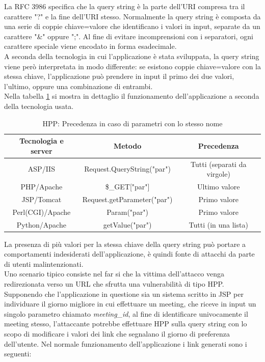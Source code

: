 La RFC 3986\cite{rfc3986} specifica che la query string è la parte dell'URI compresa tra il carattere "?" e la fine dell'URI stesso. Normalmente la query string è composta da una serie di coppie chiave=valore che identificano i valori in input, separate da un carattere "\&" oppure ";". Al fine di evitare incomprensioni con i separatori, ogni carattere speciale viene encodato in forma esadecimale.	\\
A seconda della tecnologia in cui l'applicazione è stata sviluppata, la query string viene però interpretata in modo differente: se esistono coppie chiave=valore con la stessa chiave, l'applicazione può prendere in input il primo dei due valori, l'ultimo, oppure una combinazione di entrambi.\\
Nella tabella \ref{hpp} si mostra in dettaglio il funzionamento dell'applicazione a seconda della tecnologia usata.

\begin{table}[!h]
\center
\begin{tabular}{|c|c|c|}
\hline
Tecnologia e server & Metodo & Precedenza \\
\hline
ASP/IIS & Request.QueryString("par") & Tutti (separati da virgole)\\
PHP/Apache & \$\_GET["par"] & Ultimo valore \\
JSP/Tomcat & Request.getParameter("par") & Primo valore \\
Perl(CGI)/Apache & Param("par") & Primo valore \\
Python/Apache & getValue("par") & Tutti (in una lista)\\
\hline
\end{tabular}
\caption{HPP: Precedenza in caso di parametri con lo stesso nome}
\label{hpp}
\end{table}


La presenza di più valori per la stessa chiave della query string può portare a comportamenti indesiderati dell'applicazione, è quindi fonte di attacchi da parte di utenti malintenzionati.\\
Uno scenario tipico consiste nel far si che la vittima dell'attacco venga redirezionata verso un URL che sfrutta una vulnerabilità di tipo HPP. Supponendo che l'applicazione in questione sia un sistema scritto in JSP per individuare il giorno migliore in cui effettuare un meeting, che riceve in input un singolo parametro chiamato \emph{meeting\_id}, al fine di identificare univocamente il meeting stesso, l'attaccante potrebbe effettuare HPP sulla query string con lo scopo di modificare i valori dei link che segnalano il giorno di preferenza dell'utente.
Nel normale funzionamento dell'applicazione i link generati sono i seguenti:\\


